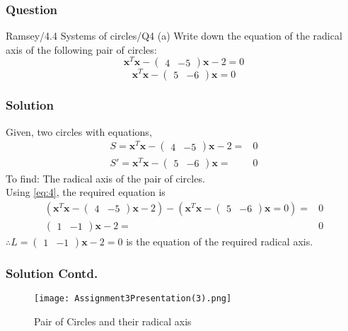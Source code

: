 \documentclass{beamer}
\newcommand{\myvec}[1]{\ensuremath{\begin{pmatrix}#1\end{pmatrix}}}
\providecommand{\brak}[1]{\ensuremath{\left(#1\right)}}
\renewcommand{\vec}[1]{\mathbf{#1}}
\begin{document}
\begin{frame}
\frametitle{Question}
\begin{block}{Ramsey/4.4 Systems of circles/Q4 (a)}
Write down the equation of the radical axis of the following pair of circles:
$$\vec{x}^{T}\vec{x}-\myvec{
4 & -5}\vec{x}-2=0$$
$$\vec{x}^{T}\vec{x}-\myvec{
5 & -6}\vec{x}=0$$
\end{block}
\end{frame}

\begin{frame}
\frametitle{Solution}
Given, two circles with equations,
\begin{align}
S=\vec{x}^{T}\vec{x}-\myvec{4 & -5}\vec{x}-2=&0\label{eq:5}\\
S'=\vec{x}^{T}\vec{x}-\myvec{5 & -6}\vec{x}=&0\label{eq:6}
\end{align}
To find: The radical axis of the pair of circles.\\
Using \eqref{eq:4}, the required equation is
\begin{align}
\brak{\vec{x}^{T}\vec{x}-\myvec{4 & -5}\vec{x}-2}-\brak{\vec{x}^{T}\vec{x}-\myvec{5 & -6}\vec{x}=0}=&0\\
\myvec{1 & -1}\vec{x}-2=&0
\end{align}
$\therefore L=\myvec{1 & -1}\vec{x}-2=0$ is the equation of the required radical axis.
\end{frame}

\begin{frame}
\frametitle{Solution Contd.}
\begin{figure}[!h]
 \centering
 \texttt{[image: Assignment3Presentation(3).png]}
 \caption{Pair of Circles and their radical axis}
 \label{plot}
\end{figure}
\end{frame}
\end{document}
